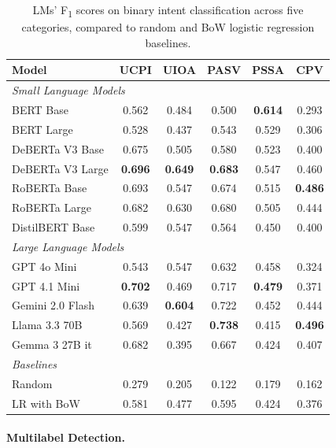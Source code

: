 \documentclass[11pt]{article}
\begin{document}
\begin{table}[h]
\centering
\scriptsize
\begin{tabular}{lccccc}
\toprule
\textbf{Model} & \textbf{UCPI} & \textbf{UIOA} & \textbf{PASV} & \textbf{PSSA} & \textbf{CPV} \\
\midrule
\multicolumn{5}{l}{\textit{Small Language Models}}\\
\midrule
BERT Base         & 0.562 & 0.484 & 0.500 & \textbf{0.614} & 0.293 \\
BERT Large        & 0.528 & 0.437 & 0.543 & 0.529 & 0.306 \\
DeBERTa V3 Base   & 0.675 & 0.505 & 0.580 & 0.523 & 0.400 \\
DeBERTa V3 Large  & \textbf{0.696} &\textbf{0.649} & \textbf{0.683} & 0.547 & 0.460 \\
RoBERTa Base      & 0.693 & 0.547 & 0.674 & 0.515 & \textbf{0.486} \\
RoBERTa Large     & 0.682 & 0.630  & 0.680 & 0.505 & 0.444 \\
DistilBERT Base   & 0.599 & 0.547 & 0.564 & 0.450 & 0.400 \\
\midrule
\multicolumn{5}{l}{\textit{Large Language Models}}\\
\midrule
GPT 4o Mini                         & 0.543 & 0.547 & 0.632 & 0.458 & 0.324 \\
GPT 4.1 Mini                        & \textbf{0.702} & 0.469 & 0.717 & \textbf{0.479} & 0.371 \\
Gemini 2.0 Flash                    & 0.639 & \textbf{0.604} & 0.722 & 0.452 & 0.444 \\
Llama 3.3 70B                      & 0.569 & 0.427 & \textbf{0.738} & 0.415 & \textbf{0.496} \\
Gemma 3 27B it & 0.682 & 0.395 & 0.667 & 0.424 & 0.407 \\
\midrule
\multicolumn{5}{l}{\textit{Baselines}}\\
\midrule
Random   & 0.279 & 0.205 & 0.122 & 0.179 & 0.162 \\
LR with BoW   & 0.581 & 0.477 & 0.595 & 0.424 & 0.376 \\
\bottomrule
\end{tabular}
\caption{LMs’ F\textsubscript{1} scores on binary intent classification across five categories, compared to random and BoW logistic regression baselines.}
\label{tab:intent-per-class-slms-results}
\end{table}



\paragraph{Multilabel Detection.}
\end{document}
